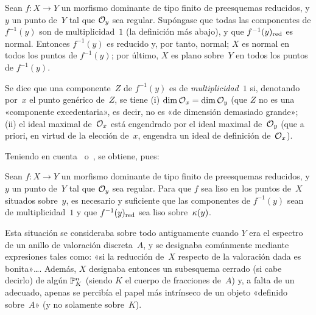\begin{proposition}
\label{II.2.5}
Sean $f\colon X\to Y$ un morfismo dominante de tipo finito de preesquemas reducidos, y $y$ un punto de~$Y$ tal que $\cal{O}_y$ sea regular. Supóngase que todas las componentes de $f^{-1}(y)$ son de multiplicidad~$1$
%
(\cf la definición más abajo), y que $f^{-1}(y)_{\red}$ es normal. Entonces $f^{-1}(y)$ es reducido y, por tanto, normal; $X$ es normal en todos los puntos de $f^{-1}(y)$; por último, $X$ es plano sobre~$Y$ en todos los puntos de $f^{-1}(y)$.
\end{proposition}
Se
dice que una componente~$Z$ de $f^{-1}(y)$ es de \emph{multiplicidad}~$1$
%
si, denotando por~$x$ el punto genérico de~$Z$, se tiene \textup{(i)} $\dim\cal{O}_x=\dim\cal{O}_y$ (\ie que $Z$ no es una «componente excedentaria», es decir, no es «de dimensión demasiado grande»;\ %
\textup{(ii)} el ideal maximal de~$\cal{O}_x$ está engendrado por el ideal maximal de~$\cal{O}_y$ (que a priori, en virtud de la elección de~$x$, engendra un ideal de definición de~$\cal{O}_x$).

Teniendo en cuenta~ o~, se obtiene, pues:

\begin{corollaire}
\label{II.2.6}
Sean $f\colon X\to Y$ un morfismo dominante de tipo finito de preesquemas reducidos, y $y$ un punto de~$Y$ tal que $\cal{O}_y$ sea regular. Para que $f$ sea liso en los puntos de~$X$ situados sobre~$y$, es necesario y suficiente que las componentes de $f^{-1}(y)$ sean de multiplicidad~$1$ y que $f^{-1}(y)_{\red}$ sea liso sobre~$\kres(y)$.
\end{corollaire}

Esta situación se consideraba sobre todo antiguamente cuando $Y$ era el espectro de un anillo de valoración discreta~$A$, y se designaba comúnmente mediante expresiones tales como: «si la reducción de~$X$ respecto de la valoración dada es bonita»\dots. Además, $X$ designaba entonces un subesquema cerrado (si cabe decirlo) de algún $\PP_K^n$ (siendo $K$ el cuerpo de fracciones de~$A$) y, a falta de un
\ %
adecuado, apenas se percibía el papel más intrínseco de un objeto «definido sobre~$A$» (y no solamente sobre~$K$).
